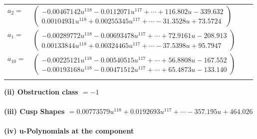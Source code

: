 \documentclass[1p]{elsarticle_modified}
\theoremstyle{definition}
\begin{document}
\begin{tabular}{m{7pt} m{180pt} m{7pt} m{180pt} }
\flushright $a_{2}=$&$\begin{pmatrix}-0.00467142 u^{118}-0.0112071 u^{117}+\cdots+116.802 u-339.632\\0.00104931 u^{118}+0.00255345 u^{117}+\cdots-31.3528 u+73.5724\end{pmatrix}$ \\
\flushright $a_{1}=$&$\begin{pmatrix}-0.00289772 u^{118}-0.00693478 u^{117}+\cdots+72.9161 u-208.913\\0.00133844 u^{118}+0.00324465 u^{117}+\cdots-37.5398 u+95.7947\end{pmatrix}$ \\
\flushright $a_{10}=$&$\begin{pmatrix}-0.00225121 u^{118}-0.00540515 u^{117}+\cdots+56.8808 u-167.552\\-0.00193168 u^{118}-0.00471512 u^{117}+\cdots+65.4873 u-133.140\end{pmatrix}$\\&\end{tabular}
\flushleft \textbf{(ii) Obstruction class $= -1$}\\~\\
\flushleft \textbf{(iii) Cusp Shapes $= 0.00773579 u^{118}+0.0192693 u^{117}+\cdots-357.195 u+464.026$}\\~\\
\newpage\renewcommand{\arraystretch}{1}
\flushleft \textbf{(iv) u-Polynomials at the component}\newline \\
\end{document}
